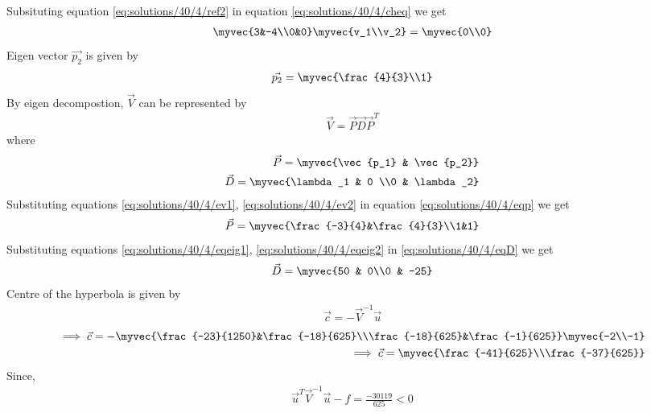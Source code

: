Subsituting equation \eqref{eq:solutions/40/4/ref2} in equation \eqref{eq:solutions/40/4/cheq} we get 
\begin{align}
    \myvec{3&-4\\0&0}\myvec{v_1\\v_2}=\myvec{0\\0}\label{eq:solutions/40/4/eig2}
\end{align}
Eigen vector $\vec{p_2}$ is given by
\begin{align}
        \vec{p_2}=\myvec{\frac{4}{3}\\1}\label{eq:solutions/40/4/ev2}
\end{align}
By eigen decompostion, $\vec{V}$ can be represented by
\begin{align}
    \vec{V}=\vec{P}\vec{D}\vec{P}^T\label{eq:solutions/40/4/evd}
\end{align}
where 
\begin{align}
        \vec{P}=\myvec{\vec{p_1} & \vec{p_2}}\label{eq:solutions/40/4/eqp}\\
    \vec{D}=\myvec{\lambda_1 & 0 \\0 & \lambda_2}\label{eq:solutions/40/4/eqD}
\end{align}
Substituting equations \eqref{eq:solutions/40/4/ev1}, \eqref{eq:solutions/40/4/ev2} in equation \eqref{eq:solutions/40/4/eqp} we get 
\begin{align}
    \vec{P}=\myvec{\frac{-3}{4}&\frac{4}{3}\\1&1}\label{eq:solutions/40/4/eqP}
\end{align}
Substituting equations \eqref{eq:solutions/40/4/eqeig1}, \eqref{eq:solutions/40/4/eqeig2} in \eqref{eq:solutions/40/4/eqD} we get
\begin{align}
       \vec{D}=\myvec{50 & 0\\0 & -25}\label{eq:solutions/40/4/eqDD}
\end{align}
Centre of the hyperbola is given by 
\begin{align}
    \vec{c}=-\vec{V}^{-1}\vec{u}
\end{align}
\begin{align}
    \implies\vec{c}=-\myvec{\frac{-23}{1250}&\frac{-18}{625}\\\frac{-18}{625}&\frac{-1}{625}}\myvec{-2\\-1}\\
    \implies\vec{c}=\myvec{\frac{-41}{625}\\\frac{-37}{625}}
\end{align}
Since,
\begin{align}
    \vec{u}^T\vec{V}^{-1}\vec{u}-f = \frac{-30119}{625}<0\label{eq:solutions/40/4/cond}
\end{align} 
